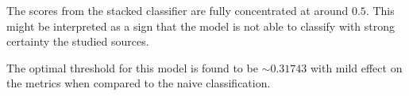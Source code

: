 \documentclass{aa}
\begin{document}
The scores from the stacked classifier are fully concentrated at around $0.5$. This might be interpreted as a sign that the model is not able to classify with strong certainty the studied sources.

The optimal threshold for this model is found to be ${\sim}0.31743$ with mild effect on the metrics when compared to the naive classification.

\begin{table}
\caption{Best performing models the radio detection classification}             %
\label{table:fit_radio_models}      %
\centering                          %
\end{table}
\end{document}
